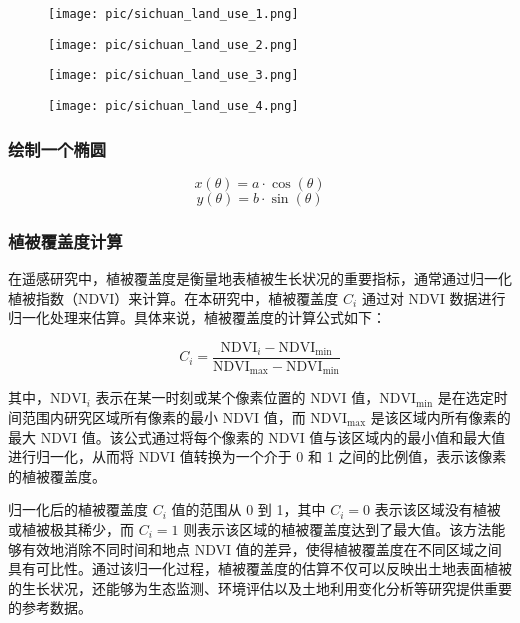 \documentclass{article}
\begin{document}
		
		
		\begin{figure}[H]  %
			\centering
			\texttt{[image: pic/sichuan\_land\_use\_1.png]} %
		\end{figure}
		\begin{figure}[H]  %
			\centering
			\texttt{[image: pic/sichuan\_land\_use\_2.png]} %
		\end{figure}
		\begin{figure}[H]  %
			\centering
			\texttt{[image: pic/sichuan\_land\_use\_3.png]} %
		\end{figure}
		\begin{figure}[H]  %
			\centering
			\texttt{[image: pic/sichuan\_land\_use\_4.png]} %
		\end{figure}
		
		
		\subsubsection{绘制一个椭圆}
		
		\[
		x(\theta) = a \cdot \cos(\theta)
		\]
		\[
		y(\theta) = b \cdot \sin(\theta)
		\]
		\subsubsection{植被覆盖度计算}
		在遥感研究中，植被覆盖度是衡量地表植被生长状况的重要指标，通常通过归一化植被指数（NDVI）来计算。在本研究中，植被覆盖度 \( C_i \) 通过对 NDVI 数据进行归一化处理来估算。具体来说，植被覆盖度的计算公式如下：
		
		\[
		C_i = \frac{\text{NDVI}_{i} - \text{NDVI}_{\text{min}}}{\text{NDVI}_{\text{max}} - \text{NDVI}_{\text{min}}}
		\]
		
		其中，\( \text{NDVI}_{i} \) 表示在某一时刻或某个像素位置的 NDVI 值，\( \text{NDVI}_{\text{min}} \) 是在选定时间范围内研究区域所有像素的最小 NDVI 值，而 \( \text{NDVI}_{\text{max}} \) 是该区域内所有像素的最大 NDVI 值。该公式通过将每个像素的 NDVI 值与该区域内的最小值和最大值进行归一化，从而将 NDVI 值转换为一个介于 0 和 1 之间的比例值，表示该像素的植被覆盖度。
		
		归一化后的植被覆盖度 \( C_i \) 值的范围从 0 到 1，其中 \( C_i = 0 \) 表示该区域没有植被或植被极其稀少，而 \( C_i = 1 \) 则表示该区域的植被覆盖度达到了最大值。该方法能够有效地消除不同时间和地点 NDVI 值的差异，使得植被覆盖度在不同区域之间具有可比性。通过该归一化过程，植被覆盖度的估算不仅可以反映出土地表面植被的生长状况，还能够为生态监测、环境评估以及土地利用变化分析等研究提供重要的参考数据。
		
\end{document}
